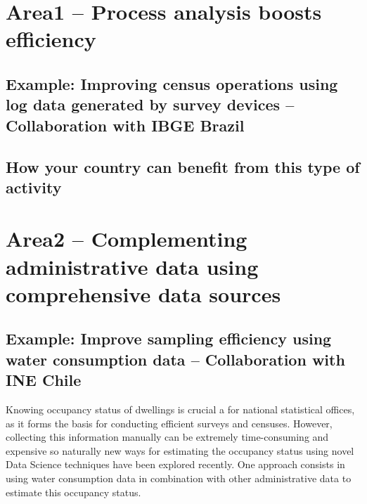 \documentclass[
]{article}
\begin{document}
\hypertarget{area1-process-analysis-boosts-efficiency}{%
\section{\texorpdfstring{\textbf{Area1} -- Process analysis boosts efficiency}{Area1 -- Process analysis boosts efficiency}}\label{area1-process-analysis-boosts-efficiency}}

\hypertarget{example-improving-census-operations-using-log-data-generated-by-survey-devices-collaboration-with-ibge-brazil}{%
\subsection{Example: Improving census operations using log data generated by survey devices -- Collaboration with IBGE Brazil}\label{example-improving-census-operations-using-log-data-generated-by-survey-devices-collaboration-with-ibge-brazil}}

\hypertarget{how-your-country-can-benefit-from-this-type-of-activity}{%
\subsection{How your country can benefit from this type of activity}\label{how-your-country-can-benefit-from-this-type-of-activity}}

\hypertarget{area2-complementing-administrative-data-using-comprehensive-data-sources}{%
\section{\texorpdfstring{\textbf{Area2} -- Complementing administrative data using comprehensive data sources}{Area2 -- Complementing administrative data using comprehensive data sources}}\label{area2-complementing-administrative-data-using-comprehensive-data-sources}}

\hypertarget{example-improve-sampling-efficiency-using-water-consumption-data-collaboration-with-ine-chile}{%
\subsection{Example: Improve sampling efficiency using water consumption data -- Collaboration with INE Chile}\label{example-improve-sampling-efficiency-using-water-consumption-data-collaboration-with-ine-chile}}

Knowing occupancy status of dwellings is crucial a for national statistical offices, as it forms the basis for conducting efficient surveys and censuses. However, collecting this information manually can be extremely time-consuming and expensive so naturally new ways for estimating the occupancy status using novel Data Science techniques have been explored recently. One approach consists in using water consumption data in combination with other administrative data to estimate this occupancy status.
\end{document}
